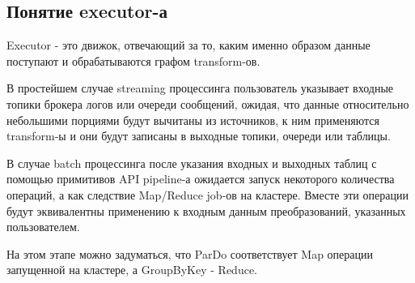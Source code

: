 \subsection{Понятие executor-а}

Executor - это движок, отвечающий за то, каким именно образом данные поступают и обрабатываются графом transform-ов.

В простейшем случае streaming процессинга пользователь указывает входные топики брокера логов или очереди сообщений, ожидая, что данные относительно небольшими порциями будут вычитаны из источников, к ним применяются transform-ы и они будут записаны в выходные топики, очереди или таблицы.

В случае batch процессинга после указания входных и выходных таблиц с помощью примитивов API pipeline-а ожидается запуск некоторого количества операций, а как следствие Map/Reduce job-ов на кластере. Вместе эти операции будут эквивалентны применению к входным данным преобразований, указанных пользователем.

На этом этапе можно задуматься, что ParDo соответствует Map операции запущенной на кластере, а GroupByKey - Reduce.
